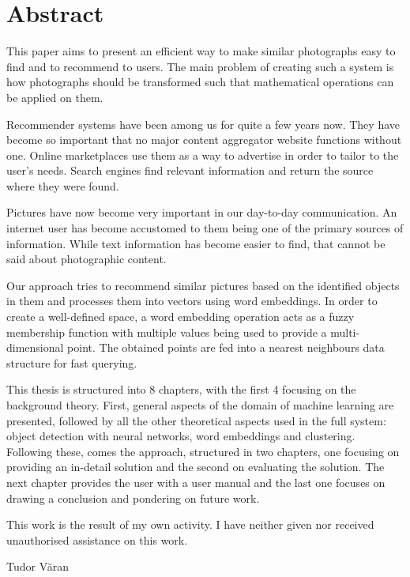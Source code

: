 \chapter*{Abstract}
\thispagestyle{empty}
\addtocounter{page}{-1}

This paper aims to present an efficient way to make similar photographs easy to find and to recommend to users. The main problem of creating such a system is how photographs should be transformed such that mathematical operations can be applied on them.

Recommender systems have been among us for quite a few years now. They have become so important that no major content aggregator website functions without one. Online marketplaces use them as a way to advertise in order to tailor to the user's needs. Search engines find relevant information and return the source where they were found.

Pictures have now become very important in our day-to-day communication. An internet user has become accustomed to them being one of the primary sources of information. While text information has become easier to find, that cannot be said about photographic content.

Our approach tries to recommend similar pictures based on the identified objects in them and processes them into vectors using word embeddings. In order to create a well-defined space, a word embedding operation acts as a fuzzy membership function with multiple values being used to provide a multi-dimensional point. The obtained points are fed into a nearest neighbours data structure for fast querying.

This thesis is structured into 8 chapters, with the first 4 focusing on the background theory. First, general aspects of the domain of machine learning are presented, followed by all the other theoretical aspects used in the full system: object detection with neural networks, word embeddings and clustering. Following these, comes the approach, structured in two chapters, one focusing on providing an in-detail solution and the second on evaluating the solution. The next chapter provides the user with a user manual and the last one focuses on drawing a conclusion and pondering on future work.

This work is the result of my own activity. I have neither given nor received unauthorised assistance on this work.

\begin{flushright}
Tudor V\u{a}ran
\end{flushright}